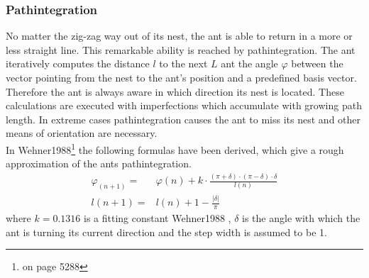 \documentclass[11pt]{article}
\begin{document}
\subsubsection{Pathintegration}\label{Sec:PathIntegration}
No matter the zig-zag way out of its nest, the ant is able to return in a more or less straight line. This remarkable ability is reached by pathintegration. The ant iteratively computes the distance $l$ to the next $L$ ant the angle $\varphi$ between the vector pointing from the nest to the ant's position and a predefined basis vector. Therefore the ant is always aware in which direction its nest is located. These calculations are executed with imperfections which accumulate with growing path length. In extreme cases pathintegration causes the ant to miss its nest and other means of orientation are necessary. \\
In Wehner1988\cite{Wehner1988}\footnote{on page 5288} the following formulas have been derived, which give a rough approximation of the ants pathintegration.
\begin{align*}
\varphi_(n+1) =& \varphi(n) +k \cdot \frac{(\pi +\delta)\cdot(\pi-\delta)\cdot \delta}{l(n)}\\
l(n+1) =& l(n) +1 -\frac{|\delta|}{\pi}
\end{align*}
where $k=0.1316$ is a fitting constant Wehner1988 \cite{Wehner1988}, $\delta$ is the angle with which the ant is turning its current direction and the step width is assumed to be 1.
\end{document}

